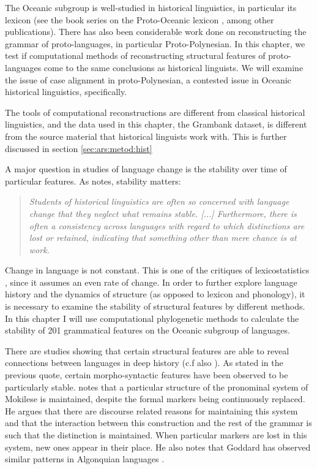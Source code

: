 \documentclass[draft,10pt]{article} %
\begin{document}
The Oceanic subgroup is well-studied in historical linguistics, in particular its lexicon (see the book series on the Proto-Oceanic lexicon \citep{protooceanicvol1, protooceanicvol2, protooceanicvol3, protooceanicvol4, protooceanicvol5}, among other publications). There has also been considerable work done on reconstructing the grammar of proto-languages, in particular Proto-Polynesian. In this chapter, we test if computational methods of reconstructing structural features of proto-languages come to the same conclusions as historical linguists. We will examine the issue of case alignment in proto-Polynesian, a contested issue in Oceanic historical linguistics, specifically.

The tools of computational reconstructions are different from classical historical linguistics, and the data used in this chapter, the Grambank dataset, is different from the source material that historical linguists work with. This is further discussed in section \ref{sec:ars:metod:hist}

A major question in studies of language change is the stability over time of particular features. As \citet[281]{ross2007two} notes, stability matters:

\begin{quotation}
\noindent\emph{Students of historical linguistics are often so concerned with language change that they neglect what remains stable.
[...] 
Furthermore, there is often a consistency across languages with regard to which distinctions are lost or retained, indicating that something other than mere chance is at work.}
\end{quotation}
\begin{flushright} \citet[281]{ross2007two} \end{flushright}

Change in language is not constant. This is one of the critiques of lexicostatistics \citep{blust2000lexicostatistics}, since it assumes an even rate of change. In order to further explore language history and the dynamics of structure (as opposed to lexicon and phonology), it is necessary to examine the stability of structural features by different methods. In this chapter I will use computational phylogenetic methods to calculate the stability of 201 grammatical features on the Oceanic subgroup of languages.

There are studies showing that certain structural features are able to reveal connections between languages in deep history \citep[143]{nichols1998origin} (c.f also  \citet{evansaustralia_2019}). As \citet{ross2007two} stated in the previous quote, certain morpho-syntactic features have been observed to be particularly stable. \citet[503]{ross2004morphosyntactic} notes that a particular structure of the pronominal system of Mokilese is maintained, despite the formal markers being continuously replaced. He argues that there are discourse related reasons for maintaining this system and that the interaction between this construction and the rest of the grammar is such that the distinction is maintained. When particular markers are lost in this system, new ones appear in their place. He also notes that Goddard has observed similar patterns in Algonquian languages \citep{goddard1993algonquian} . 
\end{document}
